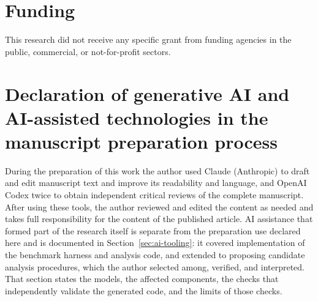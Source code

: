 \documentclass[review]{elsarticle}
\begin{document}
\section*{Funding}
This research did not receive any specific grant from funding agencies in the
public, commercial, or not-for-profit sectors.

\section*{Declaration of generative AI and AI-assisted technologies in the manuscript preparation process}
During the preparation of this work the author used Claude (Anthropic) to draft and edit
manuscript text and improve its readability and language, and OpenAI Codex twice to obtain
independent critical reviews of the complete manuscript. After using these tools, the author
reviewed and edited the content as needed and takes full responsibility for the content of
the published article. AI assistance that formed part of the research itself is separate from the preparation
use declared here and is documented in Section~\ref{sec:ai-tooling}: it covered implementation of the
benchmark harness and analysis code, and extended to proposing candidate analysis procedures, which
the author selected among, verified, and interpreted. That section states the models, the affected
components, the checks that independently validate the generated code, and the limits of those checks.



\end{document}
